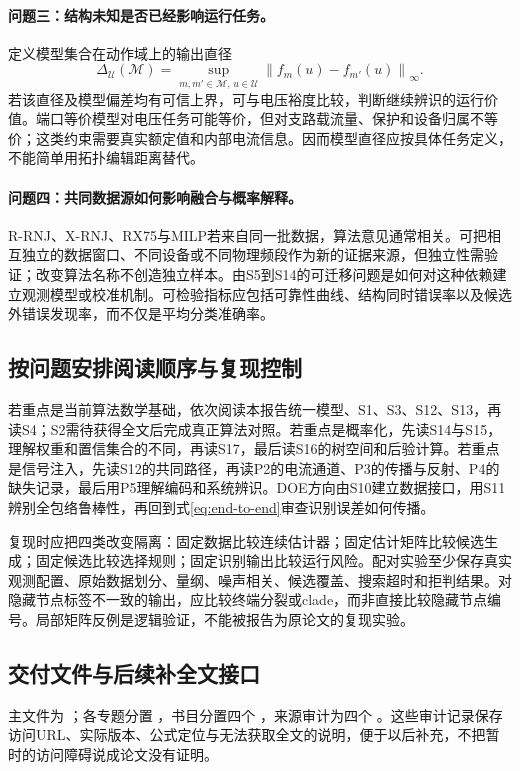 \documentclass[UTF8,11pt,fontset=fandol]{ctexart}
\newcommand{\norm}[1]{\left\lVert#1\right\rVert}
\theoremstyle{remark}
\numberwithin{equation}{section}
\begin{document}
\paragraph{问题三：结构未知是否已经影响运行任务。}
定义模型集合在动作域上的输出直径
\begin{equation}
 \Delta_{\mathcal U}(\mathcal M)=
 \sup_{m,m'\in\mathcal M,\,u\in\mathcal U}
 \norm{f_m(u)-f_{m'}(u)}_\infty.
\end{equation}
若该直径及模型偏差均有可信上界，可与电压裕度比较，判断继续辨识的运行价值。端口等价模型对电压任务可能等价，但对支路载流量、保护和设备归属不等价；这类约束需要真实额定值和内部电流信息。因而模型直径应按具体任务定义，不能简单用拓扑编辑距离替代。

\paragraph{问题四：共同数据源如何影响融合与概率解释。}
R-RNJ、X-RNJ、RX75与MILP若来自同一批数据，算法意见通常相关。可把相互独立的数据窗口、不同设备或不同物理频段作为新的证据来源，但独立性需验证；改变算法名称不创造独立样本。由S5到S14的可迁移问题是如何对这种依赖建立观测模型或校准机制。可检验指标应包括可靠性曲线、结构同时错误率以及候选外错误发现率，而不仅是平均分类准确率。

\subsection{按问题安排阅读顺序与复现控制}
若重点是当前算法数学基础，依次阅读本报告统一模型、S1、S3、S12、S13，再读S4；S2需待获得全文后完成真正算法对照。若重点是概率化，先读S14与S15，理解权重和置信集合的不同，再读S17，最后读S16的树空间和后验计算。若重点是信号注入，先读S12的共同路径，再读P2的电流通道、P3的传播与反射、P4的缺失记录，最后用P5理解编码和系统辨识。DOE方向由S10建立数据接口，用S11辨别全包络鲁棒性，再回到式\eqref{eq:end-to-end}审查识别误差如何传播。

复现时应把四类改变隔离：固定数据比较连续估计器；固定估计矩阵比较候选生成；固定候选比较选择规则；固定识别输出比较运行风险。配对实验至少保存真实观测配置、原始数据划分、量纲、噪声相关、候选覆盖、搜索超时和拒判结果。对隐藏节点标签不一致的输出，应比较终端分裂或clade，而非直接比较隐藏节点编号。局部矩阵反例是逻辑验证，不能被报告为原论文的复现实验。

\subsection{交付文件与后续补全文接口}
主文件为 ；各专题分置 ，书目分置四个 ，来源审计为四个 。这些审计记录保存访问URL、实际版本、公式定位与无法获取全文的说明，便于以后补充，不把暂时的访问障碍说成论文没有证明。
\end{document}
